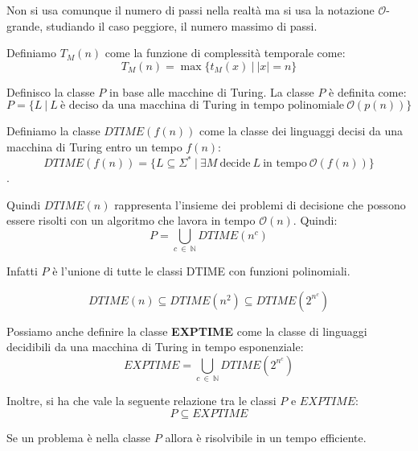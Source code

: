 Non si usa comunque il numero di passi nella realtà ma si usa la notazione $\mathcal{O}$-grande, studiando il caso peggiore, il numero massimo di passi.
\begin{definizione}
    Definiamo $T_M(n)$ come la funzione di complessità temporale come: 
    \begin{equation}
        T_M(n) = \max \{t_M(x) \ | \ |x| = n\}
    \end{equation}
\end{definizione}
\begin{definizione}
    Definisco la classe $P$ in base alle macchine di Turing. La classe $P$ è definita come:
    \begin{equation}
        P = \{L \ | \ L \ \text{è deciso da una macchina di Turing in tempo polinomiale} \ \mathcal{O}(p(n))\}
    \end{equation}
\end{definizione}
\begin{definizione}
    Definiamo la classe $DTIME(f(n))$ come la classe dei linguaggi decisi da una macchina di Turing entro un tempo $f(n)$:
    \begin{equation}
        DTIME(f(n)) = \{L \subseteq \Sigma^{\ast} \ | \ \exists M \ \text{decide} \ L \ \text{in tempo} \ \mathcal{O}(f(n)) \}
    \end{equation}$$$$. 
    
    Quindi $DTIME(n)$ rappresenta l'insieme dei problemi di decisione che possono essere risolti con un algoritmo che lavora in tempo $\mathcal{O}(n)$. Quindi:
    \begin{equation}
        P = \bigcup_{c \ \in \ \mathbb{N}} DTIME(n^c)
    \end{equation}
    
    Infatti $P$ è l'unione di tutte le classi DTIME con funzioni polinomiali.
\end{definizione}
\begin{equation}
    DTIME(n) \subseteq DTIME(n^2) \subseteq DTIME(2^{n^c})
\end{equation}

Possiamo anche definire la classe \textbf{EXPTIME} come la classe di linguaggi decidibili da una macchina di Turing in tempo esponenziale: 
\begin{equation}
    EXPTIME =  \bigcup_{c \ \in \ \mathbb{N}} DTIME(2^{n^c})
\end{equation}

Inoltre, si ha che vale la seguente relazione tra le classi $P$ e $EXPTIME$: 
\begin{equation}
    P \subseteq EXPTIME
\end{equation}
\begin{teorema}
    Se un problema è nella classe $P$ allora è risolvibile in un tempo efficiente.
\end{teorema}

